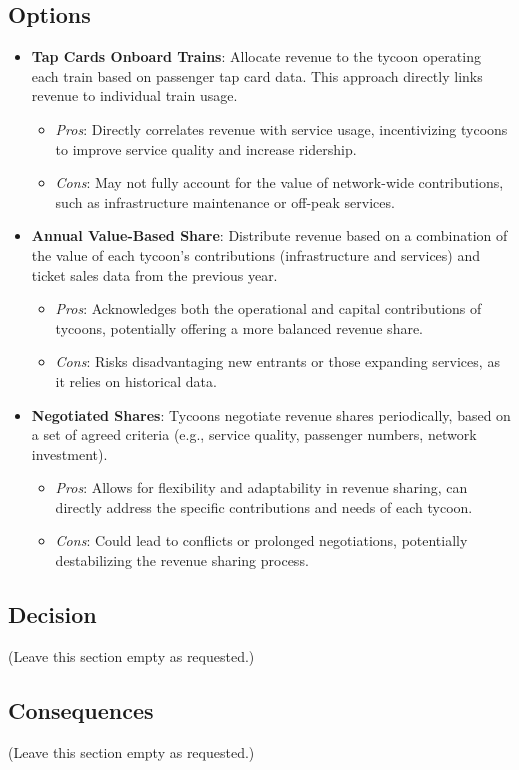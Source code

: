 \subsection*{Options}
\begin{itemize}
    \item \textbf{Tap Cards Onboard Trains}: Allocate revenue to the tycoon operating each train based on passenger tap card data. This approach directly links revenue to individual train usage.
    \begin{itemize}
        \item \textit{Pros}: Directly correlates revenue with service usage, incentivizing tycoons to improve service quality and increase ridership.
        \item \textit{Cons}: May not fully account for the value of network-wide contributions, such as infrastructure maintenance or off-peak services.
    \end{itemize}
    \item \textbf{Annual Value-Based Share}: Distribute revenue based on a combination of the value of each tycoon's contributions (infrastructure and services) and ticket sales data from the previous year.
    \begin{itemize}
        \item \textit{Pros}: Acknowledges both the operational and capital contributions of tycoons, potentially offering a more balanced revenue share.
        \item \textit{Cons}: Risks disadvantaging new entrants or those expanding services, as it relies on historical data.
    \end{itemize}
    \item \textbf{Negotiated Shares}: Tycoons negotiate revenue shares periodically, based on a set of agreed criteria (e.g., service quality, passenger numbers, network investment).
    \begin{itemize}
        \item \textit{Pros}: Allows for flexibility and adaptability in revenue sharing, can directly address the specific contributions and needs of each tycoon.
        \item \textit{Cons}: Could lead to conflicts or prolonged negotiations, potentially destabilizing the revenue sharing process.
    \end{itemize}
\end{itemize}

\subsection*{Decision}
(Leave this section empty as requested.)

\subsection*{Consequences}
(Leave this section empty as requested.)


